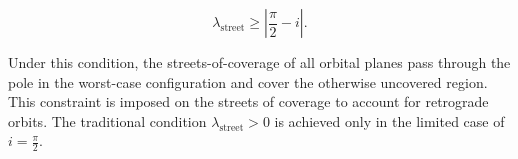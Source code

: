 \begin{equation}
    \lambda_{\mathrm{street}} \geq \left|\frac{\pi}{2}-i\right|.
\end{equation}

Under this condition, the streets-of-coverage of all orbital planes pass through the pole in 
the worst-case configuration and cover the otherwise uncovered region. This constraint is imposed on 
the streets of coverage to account for retrograde orbits.
The traditional condition \(\lambda_{\mathrm{street}} > 0\) \cite{wertz2001ocdm} is achieved only in the limited case of \(i=\frac{\pi}{2}\).
    
    
